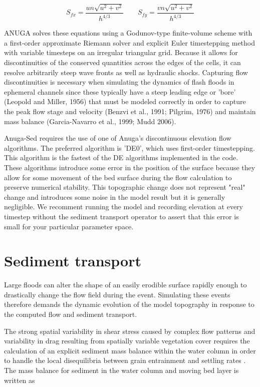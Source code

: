 \documentclass[11pt]{article}
\begin{document}
\begin{equation}
S_{fx} = \frac{un\sqrt{u^2 + v^2}}{h^{4/3}}
 \qquad
 S_{fy} = \frac{vn\sqrt{u^2 + v^2}}{h^{4/3}}
\end{equation}

ANUGA solves these equations using a Godunov-type finite-volume scheme with a first-order approximate Riemann solver \citep{toro1992riemann} and explicit Euler timestepping method with variable timesteps on an irregular triangular grid. Because it allows for discontinuities of the conserved quantities across the edges of the cells, it can resolve arbitrarily steep wave fronts as well as hydraulic shocks. Capturing flow discontinuities is necessary when simulating the dynamics of flash floods in ephemeral channels since these typically have a steep leading edge or 'bore' (Leopold and Miller, 1956) that must be modeled correctly in order to capture the peak flow stage and velocity (Benzvi et al., 1991; Pilgrim, 1976) and maintain mass balance (Garcia-Navarro et al., 1999; Mudd 2006).

Anuga-Sed requires the use of one of Anuga's discontinuous elevation flow algorithms. The preferred algorithm is 'DE0', which uses first-order timestepping. This algorithm is the fastest of the DE algorithms implemented in the code. These algorithms introduce some error in the position of the surface because they allow for some movement of the bed surface during the flow calculation to preserve numerical stability. This topographic change does not represent "real" change and introduces some noise in the model result but it is generally negligible. We recomment running the model and recording elevation at every timestep without the sediment transport operator to assert that this error is small for your particular parameter space.

\section{Sediment transport}

Large floods can alter the shape of an easily erodible surface rapidly enough to drastically change the flow field during the event. Simulating these events therefore demands the dynamic evolution of the model topography in response to the computed flow and sediment transport.

The strong spatial variability in shear stress caused by complex flow patterns and variability in drag resulting from spatially variable vegetation cover requires the calculation of an explicit sediment mass balance within the water column in order to handle the local disequilibria between grain entrainment and settling rates \citep{davy2009fluvial}. The mass balance for sediment in the water column and moving bed layer is written as
\end{document}
